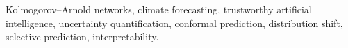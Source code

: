 \documentclass[journal]{IEEEtran}
\begin{document}
\begin{abstract}
after fitting, training costs several times more, and all evidence is from one station.
\end{abstract}

\begin{IEEEkeywords}
Kolmogorov--Arnold networks, climate forecasting, trustworthy artificial intelligence, uncertainty quantification, conformal prediction, distribution shift, selective prediction, interpretability.
\end{IEEEkeywords}











\end{document}

